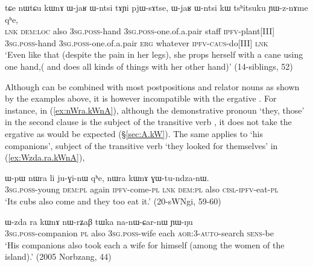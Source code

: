     \begin{exe}
\ex \label{ex:nWtCu.kWnA2}
\gll    tɕe nɯtɕu kɯnɤ ɯ-jaʁ ɯ-ntsi tɤɲi pjɯ-sɤtse, ɯ-jaʁ ɯ-ntsi kɯ tsʰitsuku ɲɯ-z-nɤme qʰe, \\
\textsc{lnk} \textsc{dem}:\textsc{loc} also \textsc{3sg}.\textsc{poss}-hand \textsc{3sg}.\textsc{poss}-one.of.a.pair staff \textsc{ipfv}-plant[III]  \textsc{3sg}.\textsc{poss}-hand \textsc{3sg}.\textsc{poss}-one.of.a.pair \textsc{erg} whatever \textsc{ipfv}-\textsc{caus}-do[III] \textsc{lnk}  \\
\glt `Even like that (despite the pain in her legs), she props herself with a cane using one hand,( and does all kinds of things with her other hand)' (14-siblings, 52)
\end{exe}

Although  can be combined with most postpositions and relator nouns as shown by the examples above, it is however incompatible with the ergative . For instance, in  (\ref{ex:nWra.kWnA}), although the demonstrative pronoun  `they, those' in the second clause is the subject of the transitive verb , it does not take the ergative  as would be expected (§\ref{sec:A.kW}). The same applies to  `his companions', subject of the transitive verb  `they looked for themselves' in (\ref{ex:Wzda.ra.kWnA}), 

  \begin{exe}
\ex \label{ex:nWra.kWnA}
\gll ɯ-pɯ nɯra li ju-ɣi-nɯ qʰe, nɯra kɯnɤ ɣɯ-tu-ndza-nɯ. \\
\textsc{3sg}.\textsc{poss}-young \textsc{dem}:\textsc{pl} again \textsc{ipfv}-come-\textsc{pl} \textsc{lnk} \textsc{dem}:\textsc{pl} also \textsc{cisl}-\textsc{ipfv}-eat-\textsc{pl} \\
\glt `Its cubs also come and they too eat it.' (20-sWNgi, 59-60)
  \end{exe}
  
    \begin{exe}
\ex \label{ex:Wzda.ra.kWnA}
\gll   ɯ-zda ra kɯnɤ nɯ-rʑaβ tɯka na-nɯ-ɕar-nɯ ɲɯ-ŋu \\
\textsc{3sg}.\textsc{poss}-companion \textsc{pl} also \textsc{3sg}.\textsc{poss}-wife each \textsc{aor}:3\flobv{}-\textsc{auto}-search \textsc{sens}-be \\
\glt `His companions also took each a wife for himself (among the women of the island).' (2005 Norbzang, 44)
    \end{exe}
    
